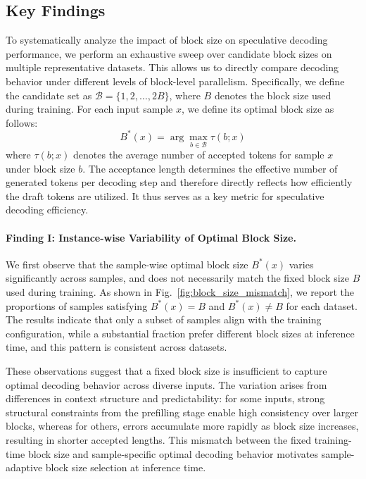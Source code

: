 \documentclass{article}
\begin{document}
\subsection{Key Findings}
To systematically analyze the impact of block size on speculative decoding performance, we perform an exhaustive sweep over candidate block sizes on multiple representative datasets. This allows us to directly compare decoding behavior under different levels of block-level parallelism. Specifically, we define the candidate set as $\mathcal{B} = \{1, 2, \ldots, 2B\}$, where $B$ denotes the block size used during training. For each input sample $x$, we define its optimal block size as follows:
\begin{equation}
\label{B*}
B^*(x) = \arg\max_{b \in \mathcal{B}} \tau(b; x)
\end{equation}
where $\tau(b; x)$ denotes the average number of accepted tokens for sample $x$ under block size $b$. The acceptance length determines the effective number of generated tokens per decoding step and therefore directly reflects how efficiently the draft tokens are utilized. It thus serves as a key metric for speculative decoding efficiency.

\paragraph{Finding I: Instance-wise Variability of Optimal Block Size.}
We first observe that the sample-wise optimal block size $B^*(x)$ varies significantly across samples, and does not necessarily match the fixed block size $B$ used during training. As shown in Fig.~\ref{fig:block_size_mismatch}, we report the proportions of samples satisfying $B^*(x)=B$ and $B^*(x)\neq B$ for each dataset. The results indicate that only a subset of samples align with the training configuration, while a substantial fraction prefer different block sizes at inference time, and this pattern is consistent across datasets.

These observations suggest that a fixed block size is insufficient to capture optimal decoding behavior across diverse inputs. The variation arises from differences in context structure and predictability: for some inputs, strong structural constraints from the prefilling stage enable high consistency over larger blocks, whereas for others, errors accumulate more rapidly as block size increases, resulting in shorter accepted lengths. This mismatch between the fixed training-time block size and sample-specific optimal decoding behavior motivates sample-adaptive block size selection at inference time.
\end{document}
